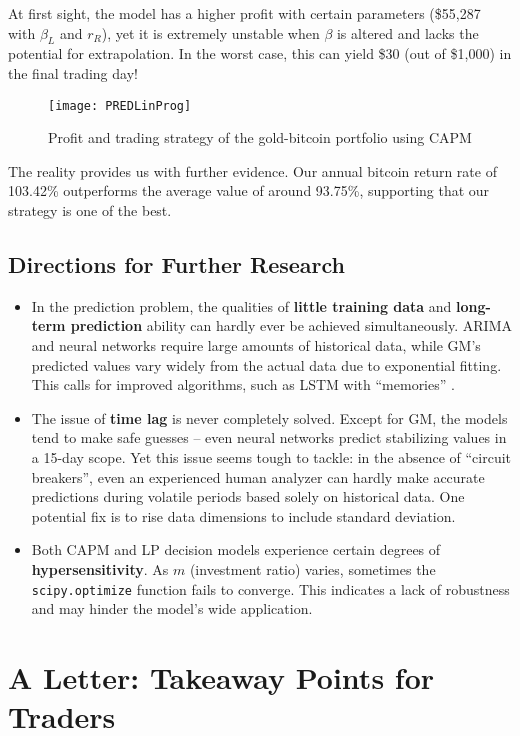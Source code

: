 \documentclass{mcmthesis}
\begin{document}
{	At first sight, the model has a higher profit with certain parameters (\$55,287 with $\beta_L$ and $r_R$), yet it is extremely unstable when $\beta$ is altered and lacks the potential for extrapolation. In the worst case, this can yield \$30 (out of \$1,000) in the final trading day! 
	
	\begin{figure}[h]
		\centering \texttt{[image: PREDLinProg]}
		\caption{Profit and trading strategy of the gold-bitcoin portfolio using CAPM}
	\end{figure}
	
	The reality provides us with further evidence. Our annual bitcoin return rate of 103.42\% outperforms the average value of around 93.75\%, supporting that our strategy is one of the best. 
	
	\subsection{Directions for Further Research}
	
	\begin{itemize}
		\item In the prediction problem, the qualities of \textbf{little training data} and \textbf{long-term prediction} ability can hardly ever be achieved simultaneously. ARIMA and neural networks require large amounts of historical data, while GM's predicted values vary widely from the actual data due to exponential fitting. This calls for improved algorithms, such as LSTM with ``memories'' \cite{LSTM2}. 
		\item The issue of \textbf{time lag} is never completely solved. Except for GM, the models tend to make safe guesses -- even neural networks predict stabilizing values in a 15-day scope. Yet this issue seems tough to tackle: in the absence of ``circuit breakers'', even an experienced human analyzer can hardly make accurate predictions during volatile periods based solely on historical data. One potential fix is to rise data dimensions to include standard deviation. 
		\item Both CAPM and LP decision models experience certain degrees of \textbf{hypersensitivity}. As $m$ (investment ratio) varies, sometimes the \verb|scipy.optimize| function fails to converge. This indicates a lack of robustness and may hinder the model's wide application. 
	\end{itemize}
	
	\newpage
	\section{A Letter: Takeaway Points for Traders}
	
}
\end{document}
